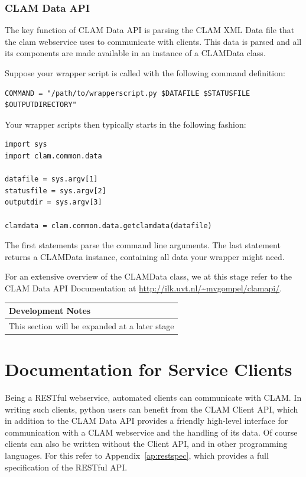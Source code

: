 \documentclass[a4paper,12pt]{report}
\newenvironment{devnotes}
{\newpage
\begin{center}
    \begin{tabular}[h!]{|p{0.8\textwidth}|}
    \hline
    {\bf Development Notes}\\\hline}
{   \\\hline
    \end{tabular}
\end{center}}
\begin{document}
\subsection{CLAM Data API}

The key function of CLAM Data API is parsing the CLAM XML Data file that the clam webservice uses to communicate with clients. This data is parsed and all its components are made available in an instance of a CLAMData class.

Suppose your wrapper script is called with the following command definition:

\begin{verbatim}
COMMAND = "/path/to/wrapperscript.py $DATAFILE $STATUSFILE $OUTPUTDIRECTORY" 
\end{verbatim}


Your wrapper scripts then typically starts in the following fashion:


\begin{verbatim}
import sys
import clam.common.data

datafile = sys.argv[1]
statusfile = sys.argv[2]
outputdir = sys.argv[3]

clamdata = clam.common.data.getclamdata(datafile)
\end{verbatim}

The first statements parse the command line arguments. The last statement returns a CLAMData instance, containing all data your wrapper might need.

For an extensive overview of the CLAMData class, we at this stage refer to the CLAM Data API Documentation at \url{http://ilk.uvt.nl/~mvgompel/clamapi/}.

\begin{devnotes}
This section will be expanded at a later stage
\end{devnotes}


\chapter{Documentation for Service Clients}

Being a RESTful webservice, automated clients can communicate with CLAM. In writing such clients, python users can benefit from the CLAM Client API, which in addition to the CLAM Data API provides a friendly high-level interface for communication with a CLAM webservice and the handling of its data. Of course clients can also be written without the Client API, and in other programming languages. For this refer to Appendix~\ref{ap:restspec}, which provides a full specification of the RESTful API.
\end{document}
